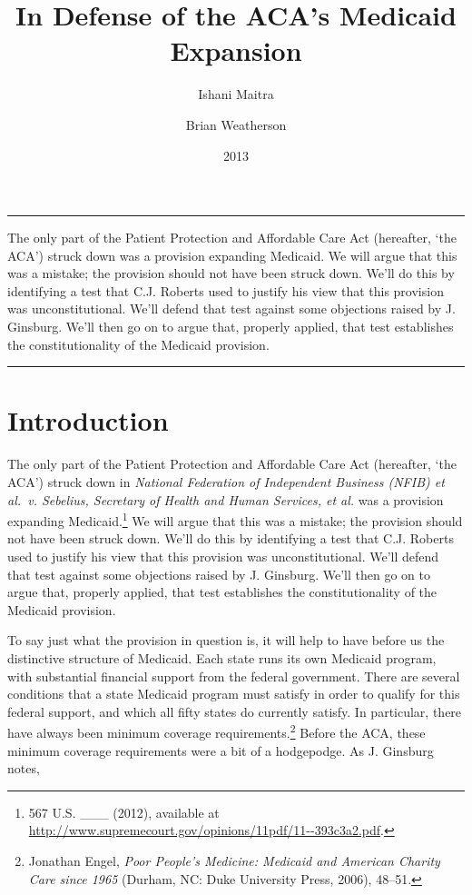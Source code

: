 \documentclass[
  10pt,
  letterpaper,
  DIV=11,
  numbers=noendperiod,
  twoside]{scrartcl}
\title{In Defense of the ACA's Medicaid Expansion}
\author{Ishani Maitra \and Brian Weatherson}
\date{2013}
\renewenvironment{abstract}
 {\vspace{-1.25cm}
 \quotation\small\noindent\rule{\linewidth}{.5pt}\par\smallskip
 \noindent }
 {\par\noindent\rule{\linewidth}{.5pt}\endquotation}
\begin{document}
\maketitle
\begin{abstract}
The only part of the Patient Protection and Affordable Care Act
(hereafter, `the ACA') struck down was a provision expanding Medicaid.
We will argue that this was a mistake; the provision should not have
been struck down. We'll do this by identifying a test that C.J. Roberts
used to justify his view that this provision was unconstitutional. We'll
defend that test against some objections raised by J. Ginsburg. We'll
then go on to argue that, properly applied, that test establishes the
constitutionality of the Medicaid provision.
\end{abstract}

\section{Introduction}\label{introduction}

The only part of the Patient Protection and Affordable Care Act
(hereafter, `the ACA') struck down in \emph{National Federation of
Independent Business (NFIB) et al.~v. Sebelius, Secretary of Health and
Human Services, et al.} was a provision expanding Medicaid.\footnote{567
  U.S. \_\_\_ (2012), available at
  \url{http://www.supremecourt.gov/opinions/11pdf/11--393c3a2.pdf}.} We
will argue that this was a mistake; the provision should not have been
struck down. We'll do this by identifying a test that C.J. Roberts used
to justify his view that this provision was unconstitutional. We'll
defend that test against some objections raised by J. Ginsburg. We'll
then go on to argue that, properly applied, that test establishes the
constitutionality of the Medicaid provision.

To say just what the provision in question is, it will help to have
before us the distinctive structure of Medicaid. Each state runs its own
Medicaid program, with substantial financial support from the federal
government. There are several conditions that a state Medicaid program
must satisfy in order to qualify for this federal support, and which all
fifty states do currently satisfy. In particular, there have always been
minimum coverage requirements.\footnote{Jonathan Engel, \emph{Poor
  People's Medicine: Medicaid and American Charity Care since 1965}
  (Durham, NC: Duke University Press, 2006), 48--51.} Before the ACA,
these minimum coverage requirements were a bit of a hodgepodge. As J.
Ginsburg notes,
\end{document}
